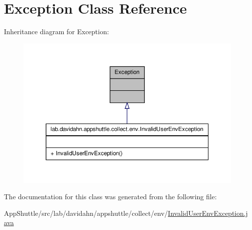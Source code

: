 \hypertarget{class_exception}{\section{\-Exception \-Class \-Reference}
\label{class_exception}
}


\-Inheritance diagram for \-Exception\-:
\nopagebreak
\begin{figure}[H]
\begin{center}
\leavevmode
\includegraphics[width=350pt]{class_exception__inherit__graph}
\end{center}
\end{figure}


\-The documentation for this class was generated from the following file\-:\begin{DoxyCompactItemize}
\item 
\-App\-Shuttle/src/lab/davidahn/appshuttle/collect/env/\hyperlink{_invalid_user_env_exception_8java}{\-Invalid\-User\-Env\-Exception.\-java}\end{DoxyCompactItemize}
